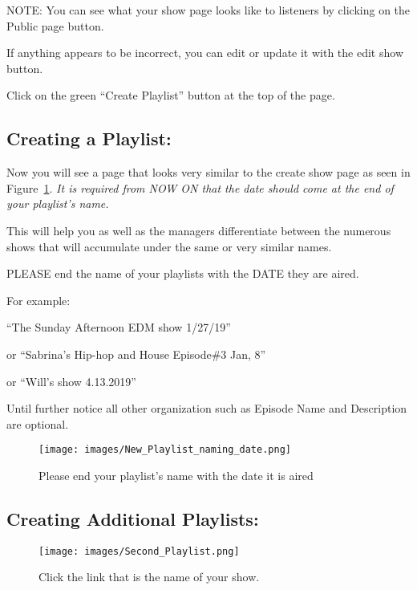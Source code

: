\documentclass[12pt]{article}
\begin{document}
\hrulefill

NOTE:
You can see what your show page looks like to listeners by clicking on the Public page button.

If anything appears to be incorrect, you can edit or update it with the edit show button.

\hrulefill

Click on the green ``Create Playlist'' button at the top of the page.

\subsection{Creating a Playlist:}
Now you will see a page that looks very similar to the create show page as seen in Figure~\ref{fig12}.
{\it It is required from NOW ON that the date should come at the end of your playlist's name. }

This will help you as well as the managers differentiate between the numerous shows that will accumulate under the same or very similar names.

\hrulefill

PLEASE end the name of your playlists with the DATE they are aired.

For example:

``The Sunday Afternoon EDM show 1/27/19''

or ``Sabrina's Hip-hop and House Episode\#3 Jan, 8''

or ``Will's show 4.13.2019''

\hrulefill

Until further notice all other organization such as Episode Name and Description are optional.

\begin{figure}[H]
    \centering
    \texttt{[image: images/New\_Playlist\_naming\_date.png]}
    \caption{Please end your playlist's name with the date it is aired}
    \label{fig12}
\end{figure}

\subsection{Creating Additional Playlists:}

\begin{wrapfigure}{r}{0.5\textwidth}
    \texttt{[image: images/Second\_Playlist.png]}
    \caption{Click the link that is the name of your show.}
    \label{fig13}
\end{wrapfigure}
\end{document}
